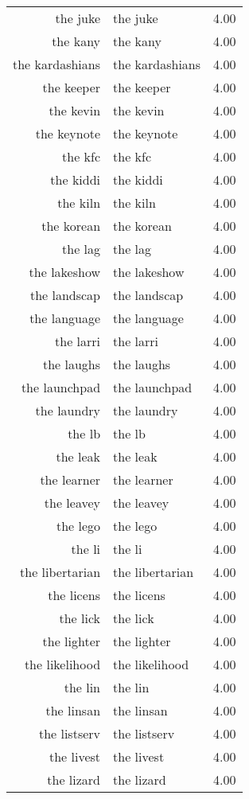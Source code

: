 \begin{table}[ht]
\begin{tabular}{rlr}
  the juke & the juke & 4.00 \\ 
  the kany & the kany & 4.00 \\ 
  the kardashians & the kardashians & 4.00 \\ 
  the keeper & the keeper & 4.00 \\ 
  the kevin & the kevin & 4.00 \\ 
  the keynote & the keynote & 4.00 \\ 
  the kfc & the kfc & 4.00 \\ 
  the kiddi & the kiddi & 4.00 \\ 
  the kiln & the kiln & 4.00 \\ 
  the korean & the korean & 4.00 \\ 
  the lag & the lag & 4.00 \\ 
  the lakeshow & the lakeshow & 4.00 \\ 
  the landscap & the landscap & 4.00 \\ 
  the language & the language & 4.00 \\ 
  the larri & the larri & 4.00 \\ 
  the laughs & the laughs & 4.00 \\ 
  the launchpad & the launchpad & 4.00 \\ 
  the laundry & the laundry & 4.00 \\ 
  the lb & the lb & 4.00 \\ 
  the leak & the leak & 4.00 \\ 
  the learner & the learner & 4.00 \\ 
  the leavey & the leavey & 4.00 \\ 
  the lego & the lego & 4.00 \\ 
  the li & the li & 4.00 \\ 
  the libertarian & the libertarian & 4.00 \\ 
  the licens & the licens & 4.00 \\ 
  the lick & the lick & 4.00 \\ 
  the lighter & the lighter & 4.00 \\ 
  the likelihood & the likelihood & 4.00 \\ 
  the lin & the lin & 4.00 \\ 
  the linsan & the linsan & 4.00 \\ 
  the listserv & the listserv & 4.00 \\ 
  the livest & the livest & 4.00 \\ 
  the lizard & the lizard & 4.00 \\ 

\end{tabular}
\end{table}
